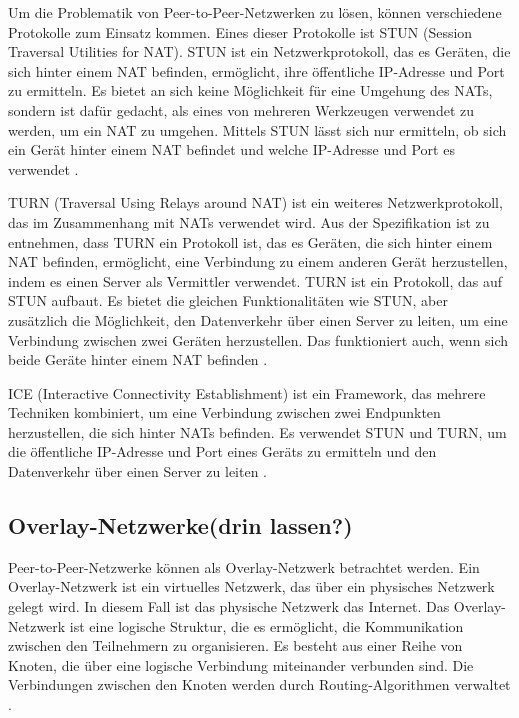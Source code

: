 Um die Problematik von Peer-to-Peer-Netzwerken zu lösen, können verschiedene Protokolle zum Einsatz kommen. Eines dieser Protokolle ist STUN (Session Traversal Utilities for NAT). STUN ist ein Netzwerkprotokoll, das es Geräten, die sich hinter einem NAT befinden, ermöglicht, ihre öffentliche IP-Adresse und Port zu ermitteln. Es bietet an sich keine Möglichkeit für eine Umgehung des NATs, sondern ist dafür gedacht, als eines von mehreren Werkzeugen verwendet zu werden, um ein NAT zu umgehen. Mittels STUN lässt sich nur ermitteln, ob sich ein Gerät hinter einem NAT befindet und welche IP-Adresse und Port es verwendet \parencite[S. 4]{rfc8489_STUN}.

TURN (Traversal Using Relays around NAT) ist ein weiteres Netzwerkprotokoll, das im Zusammenhang mit NATs verwendet wird. Aus der Spezifikation ist zu entnehmen, dass TURN ein Protokoll ist, das es Geräten, die sich hinter einem NAT befinden, ermöglicht, eine Verbindung zu einem anderen Gerät herzustellen, indem es einen Server als Vermittler verwendet. TURN ist ein Protokoll, das auf STUN aufbaut. Es bietet die gleichen Funktionalitäten wie STUN, aber zusätzlich die Möglichkeit, den Datenverkehr über einen Server zu leiten, um eine Verbindung zwischen zwei Geräten herzustellen. Das funktioniert auch, wenn sich beide Geräte hinter einem NAT befinden \parencite[S. 7]{rfc8656_TURN}.

ICE (Interactive Connectivity Establishment) ist ein Framework, das mehrere Techniken kombiniert, um eine Verbindung zwischen zwei Endpunkten herzustellen, die sich hinter NATs befinden. Es verwendet STUN und TURN, um die öffentliche IP-Adresse und Port eines Geräts zu ermitteln und den Datenverkehr über einen Server zu leiten \Parencite[S. 6]{rfc8445_ICE}.


\subsection{Overlay-Netzwerke(drin lassen?)}

Peer-to-Peer-Netzwerke können als Overlay-Netzwerk betrachtet werden. Ein Overlay-Netzwerk ist ein virtuelles Netzwerk, das über ein physisches Netzwerk gelegt wird. In diesem Fall ist das physische Netzwerk das Internet. Das Overlay-Netzwerk ist eine logische Struktur, die es ermöglicht, die Kommunikation zwischen den Teilnehmern zu organisieren. Es besteht aus einer Reihe von Knoten, die über eine logische Verbindung miteinander verbunden sind. Die Verbindungen zwischen den Knoten werden durch Routing-Algorithmen verwaltet \parencite{Lua_P2POverlayNetworksPaper}. 

